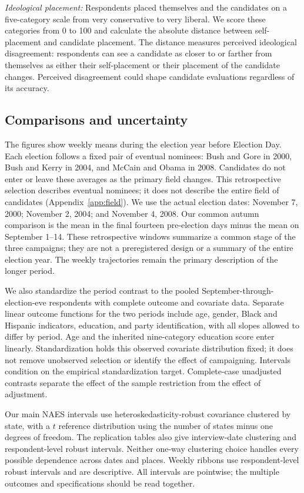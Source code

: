 \documentclass[11pt,letterpaper]{article}
\begin{document}
\textit{Ideological placement:} Respondents placed themselves and the candidates on a five-category scale from very conservative to very liberal. We score these categories from 0 to 100 and calculate the absolute distance between self-placement and candidate placement. The distance measures perceived ideological disagreement: respondents can see a candidate as closer to or farther from themselves as either their self-placement or their placement of the candidate changes. Perceived disagreement could shape candidate evaluations regardless of its accuracy.

\subsection*{Comparisons and uncertainty}
The figures show weekly means during the election year before Election Day. Each election follows a fixed pair of eventual nominees: Bush and Gore in 2000, Bush and Kerry in 2004, and McCain and Obama in 2008. Candidates do not enter or leave these averages as the primary field changes. This retrospective selection describes eventual nominees; it does not describe the entire field of candidates (Appendix~\ref{app:field}). We use the actual election dates: November 7, 2000; November 2, 2004; and November 4, 2008. Our common autumn comparison is the mean in the final fourteen pre-election days minus the mean on September 1--14. These retrospective windows summarize a common stage of the three campaigns; they are not a preregistered design or a summary of the entire election year. The weekly trajectories remain the primary description of the longer period.

We also standardize the period contrast to the pooled September-through-election-eve respondents with complete outcome and covariate data. Separate linear outcome functions for the two periods include age, gender, Black and Hispanic indicators, education, and party identification, with all slopes allowed to differ by period. Age and the inherited nine-category education score enter linearly. Standardization holds this observed covariate distribution fixed; it does not remove unobserved selection or identify the effect of campaigning. Intervals condition on the empirical standardization target. Complete-case unadjusted contrasts separate the effect of the sample restriction from the effect of adjustment.

Our main NAES intervals use heteroskedasticity-robust covariance clustered by state, with a $t$ reference distribution using the number of states minus one degrees of freedom. The replication tables also give interview-date clustering and respondent-level robust intervals. Neither one-way clustering choice handles every possible dependence across dates and places. Weekly ribbons use respondent-level robust intervals and are descriptive. All intervals are pointwise; the multiple outcomes and specifications should be read together.
\end{document}
